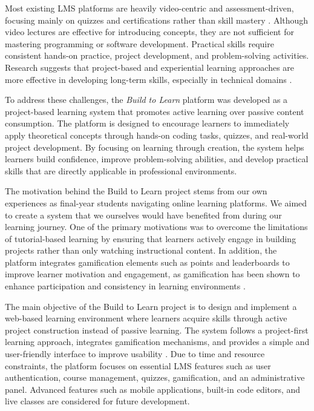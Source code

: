 \documentclass[final,3p,times,twocolumn]{elsarticle}
\begin{document}
Most existing LMS platforms are heavily video-centric and assessment-driven, focusing mainly on quizzes and certifications rather than skill mastery \cite{pahl2008learning,graf2010adaptivity}. Although video lectures are effective for introducing concepts, they are not sufficient for mastering programming or software development. Practical skills require consistent hands-on practice, project development, and problem-solving activities. Research suggests that project-based and experiential learning approaches are more effective in developing long-term skills, especially in technical domains \cite{ehlers2011quality}.

To address these challenges, the \textit{Build to Learn} platform was developed as a project-based learning system that promotes active learning over passive content consumption. The platform is designed to encourage learners to immediately apply theoretical concepts through hands-on coding tasks, quizzes, and real-world project development. By focusing on learning through creation, the system helps learners build confidence, improve problem-solving abilities, and develop practical skills that are directly applicable in professional environments.

The motivation behind the Build to Learn project stems from our own experiences as final-year students navigating online learning platforms. We aimed to create a system that we ourselves would have benefited from during our learning journey. One of the primary motivations was to overcome the limitations of tutorial-based learning by ensuring that learners actively engage in building projects rather than only watching instructional content. In addition, the platform integrates gamification elements such as points and leaderboards to improve learner motivation and engagement, as gamification has been shown to enhance participation and consistency in learning environments \cite{ux2019education}.

The main objective of the Build to Learn project is to design and implement a web-based learning environment where learners acquire skills through active project construction instead of passive learning. The system follows a project-first learning approach, integrates gamification mechanisms, and provides a simple and user-friendly interface to improve usability \cite{uiux2020design}. Due to time and resource constraints, the platform focuses on essential LMS features such as user authentication, course management, quizzes, gamification, and an administrative panel. Advanced features such as mobile applications, built-in code editors, and live classes are considered for future development.
\end{document}
